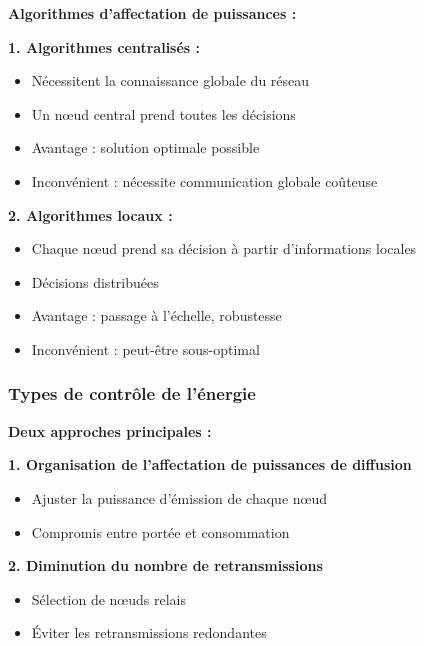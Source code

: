 \documentclass[12pt,a4paper]{article}
\begin{document}
\begin{definition}
\textbf{Algorithmes d'affectation de puissances :}

\textbf{1. Algorithmes centralisés :}
\begin{itemize}
    \item Nécessitent la connaissance globale du réseau
    \item Un nœud central prend toutes les décisions
    \item \textcolor{defvert}{Avantage} : solution optimale possible
    \item \textcolor{importantrouge}{Inconvénient} : nécessite communication globale coûteuse
\end{itemize}

\textbf{2. Algorithmes locaux :}
\begin{itemize}
    \item Chaque nœud prend sa décision à partir d'informations locales
    \item Décisions distribuées
    \item \textcolor{defvert}{Avantage} : passage à l'échelle, robustesse
    \item \textcolor{importantrouge}{Inconvénient} : peut-être sous-optimal
\end{itemize}
\end{definition}

\subsubsection{Types de contrôle de l'énergie}

\begin{definition}
\textbf{Deux approches principales :}

\textbf{1. Organisation de l'affectation de puissances de diffusion}
\begin{itemize}
    \item Ajuster la puissance d'émission de chaque nœud
    \item Compromis entre portée et consommation
\end{itemize}

\textbf{2. Diminution du nombre de retransmissions}
\begin{itemize}
    \item Sélection de nœuds relais
    \item Éviter les retransmissions redondantes
\end{itemize}
\end{definition}
\end{document}
